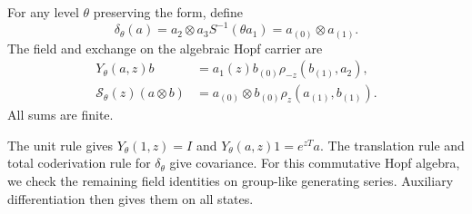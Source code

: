 For any level $\theta$ preserving the form, define
\[
 \delta_\theta(a)=a_2\otimes a_3S^{-1}(\theta a_1)
                =a_{(0)}\otimes a_{(1)}.
\]
The field and exchange on the algebraic Hopf carrier are
\begin{equation}\label{v4-arith:curve:eq:hopf-field}
 \begin{aligned}
 Y_\theta(a,z)b&=a_1(z)b_{(0)}
                    \rho_{-z}(b_{(1)},a_2),\\
 \mathcal S_\theta(z)(a\otimes b)
   &=a_{(0)}\otimes b_{(0)}\rho_z(a_{(1)},b_{(1)}).
 \end{aligned}
\end{equation}
All sums are finite.

The unit rule gives
$Y_\theta(1,z)=I$ and $Y_\theta(a,z)1=e^{zT}a$.
The translation rule and total coderivation rule for
$\delta_\theta$ give covariance.
For this commutative Hopf algebra, we check the remaining
field identities on group-like generating series.
Auxiliary differentiation then gives them on all states.

